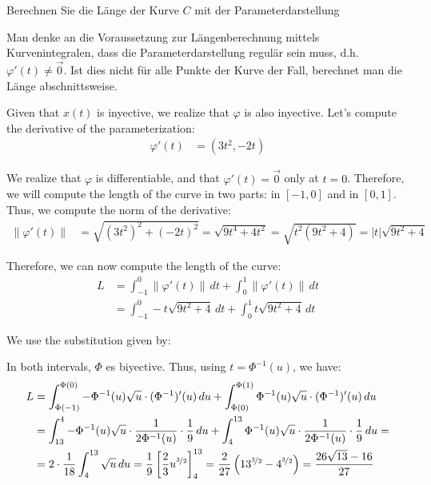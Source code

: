 \begin{ejercicio}
Berechnen Sie die Länge der Kurve $C$ mit der Parameterdarstellung

\begin{observacion}
Man denke an die Voraussetzung zur Längenberechnung mittels Kurvenintegralen, dass die Parameterdarstellung regulär sein muss, d.h. $\varphi'(t) \neq \vec{0}$. Ist dies nicht für alle Punkte der Kurve der Fall, berechnet man die Länge abschnittsweise.
\end{observacion}

    Given that $x(t)$ is inyective, we realize that $\varphi$ is also inyective. Let's compute the derivative of the parameterization:
    \begin{align*}
        \varphi'(t) &= (3t^2, -2t)
    \end{align*}

    We realize that $\varphi$ is differentiable, and that $\varphi'(t) = \vec{0}$ only at $t=0$. Therefore, we will compute the length of the curve in two parts: in $[-1,0]$ and in $[0,1]$. Thus, we compute the norm of the derivative:
    \begin{align*}
        \|\varphi'(t)\| &= \sqrt{(3t^2)^2 + (-2t)^2} = \sqrt{9t^4 + 4t^2} = \sqrt{t^2(9t^2 + 4)} = |t| \sqrt{9t^2 + 4}
    \end{align*}

    Therefore, we can now compute the length of the curve:
    \begin{align*}
        L &= \int_{-1}^{0} \|\varphi'(t)\| \, dt + \int_{0}^{1} \|\varphi'(t)\| \, dt \\
        &= \int_{-1}^{0} -t \sqrt{9t^2 + 4} \, dt + \int_{0}^{1} t \sqrt{9t^2 + 4} \, dt
    \end{align*}

    We use the substitution given by:

    In both intervals, $\Phi$ es biyective. Thus, using $t=\Phi^{-1}(u)$, we have:
    \begin{align*}
        L &= \int_{\Phi(-1)}^{\Phi(0)} -\Phi^{-1}(u) \sqrt{u} \cdot (\Phi^{-1})'(u) \, du + \int_{\Phi(0)}^{\Phi(1)} \Phi^{-1}(u) \sqrt{u} \cdot (\Phi^{-1})'(u) \, du \\
        &= \int_{13}^{4}-\Phi^{-1}(u) \sqrt{u} \cdot \dfrac{1}{2\Phi^{-1}(u)}\cdot \dfrac{1}{9}\, du + \int_{4}^{13} \Phi^{-1}(u) \sqrt{u} \cdot \dfrac{1}{2\Phi^{-1}(u)}\cdot \dfrac{1}{9} \, du
        =\\&= 2\cdot \dfrac{1}{18} \int_{4}^{13} \sqrt{u} \, du
        = \dfrac{1}{9} \left[ \dfrac{2}{3} u^{\nicefrac{3}{2}} \right]_{4}^{13}
        = \dfrac{2}{27} \left( 13^{\nicefrac{3}{2}} - 4^{\nicefrac{3}{2}} \right)
        = \dfrac{26\sqrt{13} - 16}{27}
    \end{align*}
\end{ejercicio}

